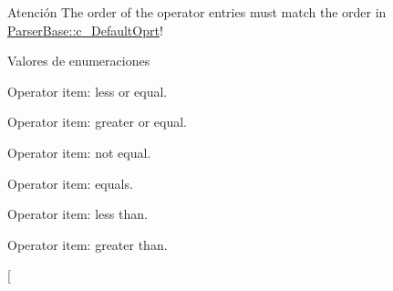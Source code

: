 \begin{DoxyAttention}{Atención}
The order of the operator entries must match the order in \hyperlink{classmu_1_1_parser_base_a0cb4d456e6a82da96786ec73044470ea}{Parser\+Base\+::c\+\_\+\+Default\+Oprt}! 
\end{DoxyAttention}
\begin{Desc}
\item[Valores de enumeraciones]\par
\begin{description}
\item[{\em 
cm\+LE\hypertarget{namespacemu_ab77181e591bebd278bf9c7a2e30ad40ea62da784138e45f161918ddc845ea4420}{}\label{namespacemu_ab77181e591bebd278bf9c7a2e30ad40ea62da784138e45f161918ddc845ea4420}
}]Operator item\+: less or equal. \item[{\em 
cm\+GE\hypertarget{namespacemu_ab77181e591bebd278bf9c7a2e30ad40ea188c6fd8324762d1513f28ef359408d7}{}\label{namespacemu_ab77181e591bebd278bf9c7a2e30ad40ea188c6fd8324762d1513f28ef359408d7}
}]Operator item\+: greater or equal. \item[{\em 
cm\+N\+EQ\hypertarget{namespacemu_ab77181e591bebd278bf9c7a2e30ad40eac34e5f492d8b0f4f2f46d7c261a02e4c}{}\label{namespacemu_ab77181e591bebd278bf9c7a2e30ad40eac34e5f492d8b0f4f2f46d7c261a02e4c}
}]Operator item\+: not equal. \item[{\em 
cm\+EQ\hypertarget{namespacemu_ab77181e591bebd278bf9c7a2e30ad40eacedcb20eed5d83ea723cb47bb2c1cc0d}{}\label{namespacemu_ab77181e591bebd278bf9c7a2e30ad40eacedcb20eed5d83ea723cb47bb2c1cc0d}
}]Operator item\+: equals. \item[{\em 
cm\+LT\hypertarget{namespacemu_ab77181e591bebd278bf9c7a2e30ad40ea1f455ded43de3f52ce0a39f9dde843e5}{}\label{namespacemu_ab77181e591bebd278bf9c7a2e30ad40ea1f455ded43de3f52ce0a39f9dde843e5}
}]Operator item\+: less than. \item[{\em 
cm\+GT\hypertarget{namespacemu_ab77181e591bebd278bf9c7a2e30ad40eac9cbc41a04d7b4dece063211d31ec5b3}{}\label{namespacemu_ab77181e591bebd278bf9c7a2e30ad40eac9cbc41a04d7b4dece063211d31ec5b3}
}]Operator item\+: greater than. \item[{\em 
}
\end{description}
\end{Desc}
